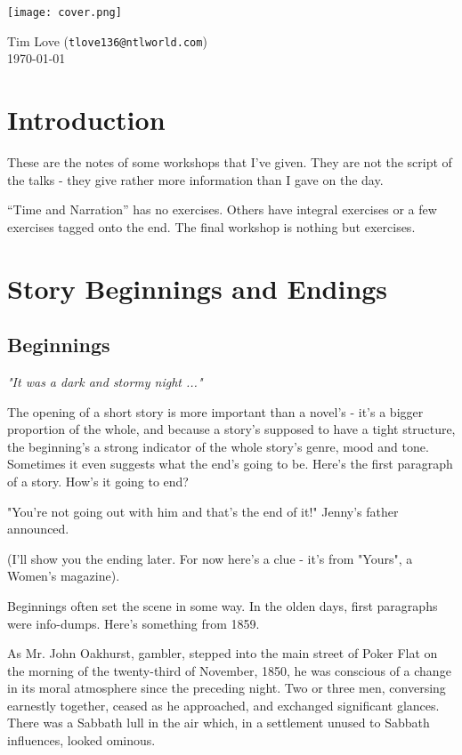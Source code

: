 \documentclass[11pt]{article}
\newenvironment{narrow}[2]{%
 \begin{list}{}{%
  \setlength{\topsep}{0pt}%
  \setlength{\leftmargin}{#1}%
  \setlength{\rightmargin}{#2}%
  \setlength{\listparindent}{\parindent}%
  \setlength{\itemindent}{\parindent}%
  \setlength{\parsep}{\parskip}%
 }%
\item[]}{\end{list}}
\begin{document}
\begin{center}
\texttt{[image: cover.png]}
\end{center}
\begin{flushright}
Tim Love (\texttt{tlove136{@}ntlworld.com})\\
\today
\end{flushright}
\newpage
\section*{Introduction}
These are the notes of some workshops that I've given. They are not the script
of the talks - they give rather more information than I gave on the day.

 ``Time and Narration'' has no exercises. Others  have integral exercises or a few exercises tagged onto the end.  The final workshop is nothing but exercises.


\tableofcontents


\newpage
\section{Story Beginnings and Endings }
\subsection*{Beginnings}
\textit{"It was a dark and stormy night ..."}



The opening of a short story is more important than a novel's - it's a bigger proportion of the whole, and because a story's supposed to have a tight structure, the beginning's a strong indicator of the whole story's genre, mood and tone. Sometimes it even suggests what the end's going to be. Here's the first paragraph of a story. How's it going to end?

\begin{narrow}{1.0cm}{1.0cm}
"You're not going out with him and that's the end of it!" Jenny's father
announced.
\end{narrow}

(I'll show you the ending later. For now here's a clue - it's from "Yours", a Women's magazine).




Beginnings often set the scene in some way. In the olden days, first paragraphs were info-dumps. Here's something from 1859.



\begin{narrow}{1.0cm}{1.0cm}
As Mr. John Oakhurst, gambler, stepped into the main street of Poker Flat on the morning of the twenty-third of November, 1850, he was conscious of a change in its moral atmosphere since the preceding night. Two or three men, conversing
earnestly together, ceased as he approached, and exchanged significant glances. There was a Sabbath lull in the air which, in a settlement unused to Sabbath influences, looked ominous.
\end{narrow}
\end{document}
